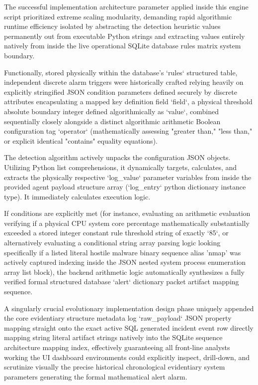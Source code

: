 The successful implementation architecture parameter applied inside this engine script prioritized extreme scaling modularity, demanding rapid algorithmic runtime efficiency isolated by abstracting the detection heuristic values permanently out from executable Python strings and extracting values entirely natively from inside the live operational SQLite database rules matrix system boundary.  

Functionally, stored physically within the database's `rules` structured table, independent discrete alarm triggers were historically crafted relying heavily on explicitly stringified JSON condition parameters defined securely by discrete attributes encapsulating a mapped key definition field `field`, a physical threshold absolute boundary integer defined algorithmically as `value`, combined sequentially closely alongside a distinct algorithmic arithmetic Boolean configuration tag `operator` (mathematically assessing "greater than," "less than," or explicit identical "contains" equality equations). 

The detection algorithm actively unpacks the configuration JSON objects. Utilizing Python list comprehensions, it dynamically targets, calculates, and extracts the physically respective `log\_value` parameter variables from inside the provided agent payload structure array (`log\_entry` python dictionary instance type). It immediately calculates execution logic. 

If conditions are explicitly met (for instance, evaluating an arithmetic evaluation verifying if a physical CPU system core percentage mathematically substantially exceeded a stored integer constant rule threshold string of exactly `85`, or alternatively evaluating a conditional string array parsing logic looking specifically if a listed literal hostile malware binary sequence alias 'nmap' was actively captured indexing inside the JSON nested system process enumeration array list block), the backend arithmetic logic automatically synthesizes a fully verified formal structured database `alert` dictionary packet artifact mapping sequence. 

A singularly crucial evolutionary implementation design phase uniquely appended the core evidentiary structure metadata log `raw\_payload` JSON property mapping straight onto the exact active SQL generated incident event row directly mapping string literal artifact strings natively into the SQLite sequence architecture mapping index, effectively guaranteeing all front-line analysts working the UI dashboard environments could explicitly inspect, drill-down, and scrutinize visually the precise historical chronological evidentiary system parameters generating the formal mathematical alert alarm.  

